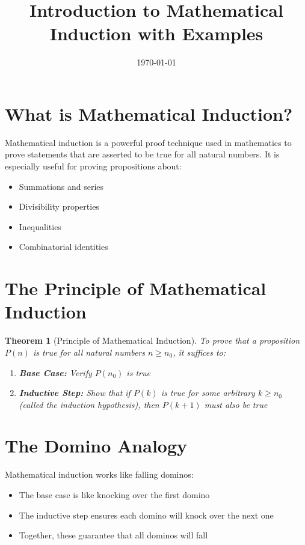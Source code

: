 \documentclass{article}
\title{Introduction to Mathematical Induction with Examples}
\date{\today}
\newtheorem{theorem}{Theorem}
\begin{document}
\maketitle

\section{What is Mathematical Induction?}
Mathematical induction is a powerful proof technique used in mathematics to prove statements that are asserted to be true for all natural numbers. It is especially useful for proving propositions about:
\begin{itemize}
    \item Summations and series
    \item Divisibility properties
    \item Inequalities
    \item Combinatorial identities
\end{itemize}

\section{The Principle of Mathematical Induction}
\begin{theorem}[Principle of Mathematical Induction]
    To prove that a proposition $P(n)$ is true for all natural numbers $n \geq n_0$, it suffices to:
    \begin{enumerate}
        \item \textbf{Base Case:} Verify $P(n_0)$ is true
        \item \textbf{Inductive Step:} Show that if $P(k)$ is true for some arbitrary $k \geq n_0$ (called the induction hypothesis), then $P(k+1)$ must also be true
    \end{enumerate}
\end{theorem}

\section{The Domino Analogy}
Mathematical induction works like falling dominos:
\begin{itemize}
    \item The base case is like knocking over the first domino
    \item The inductive step ensures each domino will knock over the next one
    \item Together, these guarantee that all dominos will fall
\end{itemize}
\end{document}
